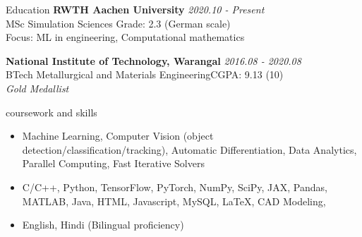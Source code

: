 \documentclass{resume} %
\begin{document}

\begin{rSection}{Education}
{\bf RWTH Aachen University} \hfill {\em 2020.10 - Present}\\
MSc Simulation Sciences \hfill {Grade: 2.3 (German scale)}\\
Focus: ML in engineering, Computational mathematics

{\bf National Institute of Technology, Warangal} \hfill {\em 2016.08 - 2020.08} \\
BTech Metallurgical and Materials Engineering\hfill {CGPA: 9.13 (10)}\\
\emph{Gold Medallist}



\end{rSection}


\begin{rSection}{coursework and skills}
\begin{itemize}
  \item Machine Learning, Computer Vision (object detection/classification/tracking), Automatic Differentiation, Data Analytics, Parallel Computing, Fast Iterative Solvers
  \item C/C++, Python, TensorFlow, PyTorch, NumPy, SciPy, JAX, Pandas, MATLAB, Java, HTML, Javascript, MySQL, {\LaTeX}, CAD Modeling, 
  \item English, Hindi (Bilingual proficiency)
\end{itemize}
\end{rSection}
\end{document}
